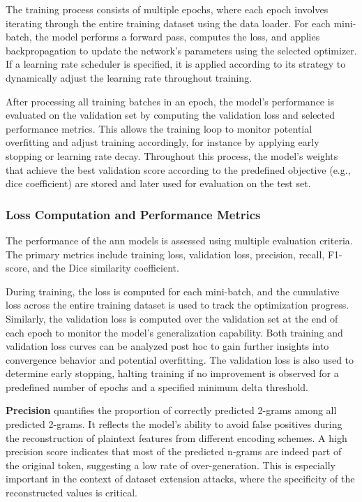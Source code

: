 The training process consists of multiple epochs, where each epoch involves iterating through the entire training dataset using the data loader.
For each mini-batch, the model performs a forward pass, computes the loss, and applies backpropagation to update the network’s parameters using the selected optimizer.
If a learning rate scheduler is specified, it is applied according to its strategy to dynamically adjust the learning rate throughout training.

After processing all training batches in an epoch, the model’s performance is evaluated on the validation set by computing the validation loss and selected performance metrics.
This allows the training loop to monitor potential overfitting and adjust training accordingly, for instance by applying early stopping or learning rate decay.
Throughout this process, the model's weights that achieve the best validation score according to the predefined objective (e.g., dice coefficient) are stored and later used for evaluation on the test set.


\subsubsection{Loss Computation and Performance Metrics}

The performance of the \ac{ann} models is assessed using multiple evaluation criteria.
The primary metrics include training loss, validation loss, precision, recall, F1-score, and the Dice similarity coefficient.

During training, the loss is computed for each mini-batch, and the cumulative loss across the entire training dataset is used to track the optimization progress.
Similarly, the validation loss is computed over the validation set at the end of each epoch to monitor the model's generalization capability.
Both training and validation loss curves can be analyzed post hoc to gain further insights into convergence behavior and potential overfitting.
The validation loss is also used to determine early stopping, halting training if no improvement is observed for a predefined number of epochs and a specified minimum delta threshold.

\textbf{Precision} quantifies the proportion of correctly predicted 2-grams among all predicted 2-grams.
It reflects the model's ability to avoid false positives during the reconstruction of plaintext features from different encoding schemes.
A high precision score indicates that most of the predicted n-grams are indeed part of the original token, suggesting a low rate of over-generation.
This is especially important in the context of dataset extension attacks, where the specificity of the reconstructed values is critical.

